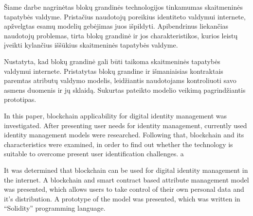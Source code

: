 
Šiame darbe nagrinėtas blokų grandinės technologijos tinkamumas skaitmeninės tapatybės valdyme. Pristačius naudotojų poreikius identiteto valdymui internete,
apžvelgtas esamų modelių gebėjimas juos išpildyti. Apibendrinus liekančias naudotojų problemas, tirta blokų grandinė ir jos charakteristikos,
kurios leistų įveikti kylančius iššūkius skaitmeninės tapatybės valdyme.

Nustatyta, kad blokų grandinė gali būti taikoma skaitmeninės tapatybės valdymui internete. Pristatytas blokų grandine ir išmaniaisias kontraktais
paremtas atributų valdymo modelis,
leidžiantis naudotojams kontroliuoti savo asmens duomenis ir jų sklaidą. Sukurtas pateikto modelio veikimą pagrindžiantis prototipas.



In this paper, blockchain applicability for digital identity management was investigated. After presenting user needs for identity management,
currently used identity management models were researched. Following that, blockchain and its characteristics were examined,
in order to find out whether the technology is suitable
to overcome present user identification challenges.   a

It was determined that blockchain can be used for digital identity management in the internet. A blockchain and smart contract based attribute management model was presented,
which allows users to take control of their own personal data and it's distribution. A prototype of the model was presented,
which was written in \enquote{Solidity} programming language.

